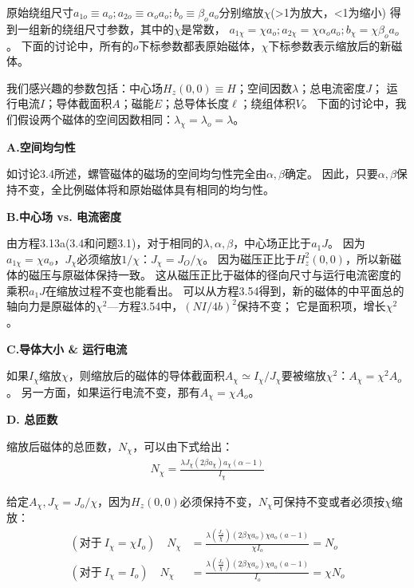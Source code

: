 原始绕组尺寸$a_{1o}\equiv a_o;a_{2o}\equiv\alpha_o a_o;b_o\equiv \beta_o a_o$分别缩放$\chi$(>1为放大，<1为缩小)
得到一组新的绕组尺寸参数，其中的$\chi$是常数，
$a_{1\chi}=\chi a_o;a_{2\chi}=\chi\alpha_o a_o; b_\chi=\chi \beta_o a_o$。
下面的讨论中，所有的$o$下标参数都表原始磁体，$\chi$下标参数表示缩放后的新磁体。

我们感兴趣的参数包括：中心场$H_z(0, 0)\equiv H$；空间因数$\lambda$；总电流密度$J$；
运行电流$I$；导体截面积$A$；磁能$E$；总导体长度$\ell$；绕组体积$V$。
下面的讨论中，我们假设两个磁体的空间因数相同：$\lambda_\chi=\lambda_o=\lambda$。 

\textbf{A.空间均匀性}

如讨论3.4所述，螺管磁体的磁场的空间均匀性完全由$\alpha,\beta$确定。
因此，只要$\alpha,\beta$保持不变，全比例磁体将和原始磁体具有相同的均匀性。

\textbf{B.中心场 vs. 电流密度}

由方程3.13a(3.4和问题3.1)，对于相同的$\lambda,\alpha,\beta$，中心场正比于$a_1 J$。
因为$a_{1\chi}=\chi a_o$，$J_\chi$必须缩放$1/\chi$：$J_\chi=J_O/\chi$。
因为磁压正比于$H_z^2(0, 0)$，所以新磁体的磁压与原磁体保持一致。
这从磁压正比于磁体的径向尺寸与运行电流密度的乘积$a_1 J$在缩放过程不变也能看出。
可以从方程3.54得到，新的磁体的中平面总的轴向力是原磁体的$\chi^2$---方程3.54中，$(NI/4b)^2$保持不变；
它是面积项，增长$\chi^2$。

\textbf{C.导体大小 \& 运行电流}

如果$I_\chi$缩放$\chi$，则缩放后的磁体的导体截面积$A_\chi\simeq I_\chi/J_\chi$要被缩放$\chi^2$：$A_\chi=\chi^2 A_o$。
另一方面，如果运行电流不变，那有$A_\chi=\chi A_o$。

\textbf{D. 总匝数}

缩放后磁体的总匝数，$N_\chi$，可以由下式给出：
\begin{align}
N_{\chi}=\frac{\lambda J_{\chi}(2\beta a_{\chi})a_{\chi}(\alpha-1)}{I_{\chi}}%
\end{align}

给定$A_\chi,J_\chi =J_o/\chi$，因为$H_z(0,0)$必须保持不变，$N_\chi$可保持不变或者必须按$\chi$缩放：
\begin{align*}
(\mbox{对于}\ I_{\chi}=\chi I_{o})\quad N_{\chi}&=\frac{\lambda(\frac{J_{o}}{\chi})(2\beta\chi a_{o})\chi a_{o}(a-1)}{\chi I_{o}}=N_{o}\tag{3.168b}\\
(\mbox{对于}\ I_{\chi}=I_{o})\quad  N_{\chi}&=\frac{\lambda(\frac{J_{o}}{\chi})(2\beta\chi a_{o})\chi a_{o}(a-1)}{I_{o}}=\chi N_{o}\tag{3.168c}%
\end{align*}

